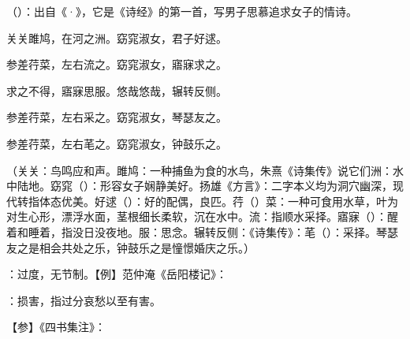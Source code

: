 {
\item {}（）：出自《·》，它是《诗经》的第一首，写男子思慕追求女子的情诗。
\begin{lyquotepoem}
关关雎鸠，在河之洲。窈窕淑女，君子好逑。

参差荇菜，左右流之。窈窕淑女，寤寐求之。

求之不得，寤寐思服。悠哉悠哉，辗转反侧。

参差荇菜，左右采之。窈窕淑女，琴瑟友之。

参差荇菜，左右芼之。窈窕淑女，钟鼓乐之。
\end{lyquotepoem}
（关关：鸟鸣应和声。雎鸠：一种捕鱼为食的水鸟，朱熹《诗集传》说它们洲：水中陆地。窈窕（）：形容女子娴静美好。扬雄《方言》：二字本义均为洞穴幽深，现代转指体态优美。好逑（）：好的配偶，良匹。荇（）菜：一种可食用水草，叶为对生心形，漂浮水面，茎根细长柔软，沉在水中。流：指顺水采择。寤寐（）：醒着和睡着，指没日没夜地。服：思念。辗转反侧：《诗集传》：芼（）：采择。琴瑟友之是相会共处之乐，钟鼓乐之是憧憬婚庆之乐。）

\item {}：过度，无节制。【例】范仲淹《岳阳楼记》：

：损害，指过分哀愁以至有害。

【参】《四书集注》：
}
{}


